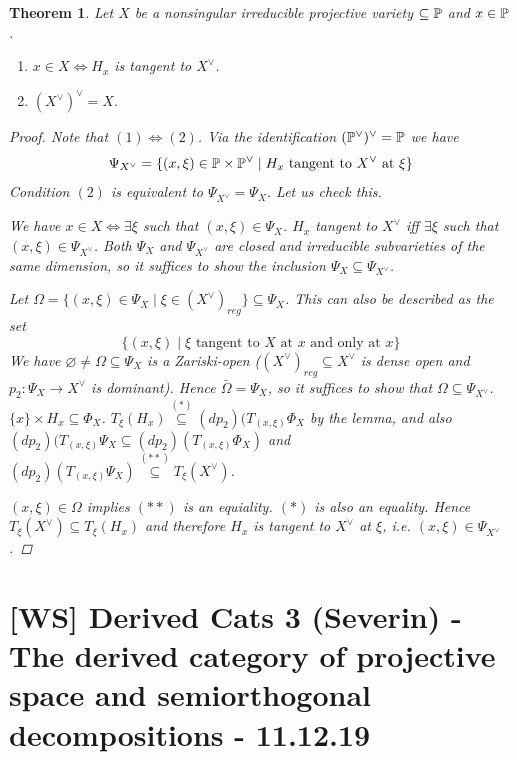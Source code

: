 \documentclass[A4paper, british]{amsart}
\theoremstyle{darkgreentheorem}
\newtheorem{thm}{Theorem}[section]
\theoremstyle{darkbluedefinition}
\theoremstyle{darkredexample}
\theoremstyle{remark}
\newcommand{\1}{\mathbbm{1}}
\newcommand{\dual}{^{\vee}}
\newcommand{\sub}{\subseteq}
\begin{document}
\begin{thm}
    Let $X$ be a nonsingular irreducible projective variety $\sub \P$ and $x\in \P$.
    \begin{enumerate}
	\item $x\in X \Leftrightarrow H_{x}$ is tangent to $X\dual$.
	\item $(X\dual)\dual = X$.
    \end{enumerate}
    \begin{proof}
	Note that $(1)\Leftrightarrow (2)$.
	Via the identification $(\P\dual)\dual= \P$ we have
	\[ \Psi_{X\dual}=\{ (x,\xi)\in \P\times \P\dual \mid H_{x}\text{ tangent to }X\dual \text{ at }\xi\} \]
	Condition $(2)$ is equivalent to $\Psi_{X\dual}=\Psi_{X}$.
	Let us check this.

	We have $x\in X\Leftrightarrow \exists \xi$ such that $(x,\xi)\in \Psi_{X}$.
	$H_{x}$ tangent to $X\dual$ iff $\exists \xi$ such that $(x,\xi)\in \Psi_{X\dual}$.
	Both $\Psi_{X}$ and $\Psi_{X\dual}$ are closed and irreducible subvarieties of the same dimension, so it suffices to show the inclusion $\Psi_{X}\sub \Psi_{X\dual}$.

	Let $\Omega=\{ (x,\xi)\in \Psi_{X} \mid \xi\in (X\dual)_{reg} \}\sub \Psi_{X}$.
	This can also be described as the set
	\[ \{(x,\xi)\mid \xi \text{ tangent to }X\text{ at }x \text{ and only at }x\} \]
	We have $\varnothing \neq \Omega\sub \Psi_{X}$ is a Zariski-open ($(X\dual)_{reg}\sub X\dual$ is dense open and $p_{2}\colon \Psi_{X}\to X\dual$ is dominant).
	Hence $\bar{\Omega}=\Psi_{X}$, so it suffices to show that $\Omega\sub \Psi_{X\dual}$.
	$\{x\}\times H_{x}\sub \Phi_{X}$.
	$T_{\xi}(H_{x})\overset{(*)}{\sub} (dp_{2})(T_{(x,\xi)}\Phi_{X}$ by the lemma, and also $(dp_{2})(T_{(x,\xi)}\Psi_{X}\sub (dp_{2})(T_{(x,\xi)}\Phi_{X})$ and $(dp_{2})(T_{(x,\xi)}\Psi_{X})\overset{(**)}{\sub} T_{\xi}(X\dual)$.

	$(x,\xi)\in \Omega$ implies $(**)$ is an equiality.
	$(*)$ is also an equality.
	Hence $T_{\xi}(X\dual)\sub T_{\xi}(H_{x})$ and therefore $H_{x}$ is tangent to $X\dual $ at $\xi$, i.e. $(x,\xi)\in \Psi_{X\dual}$.
    \end{proof}
\end{thm}

\section{[WS] Derived Cats 3 (Severin) - The derived category of projective space and semiorthogonal decompositions - 11.12.19}
\end{document}
